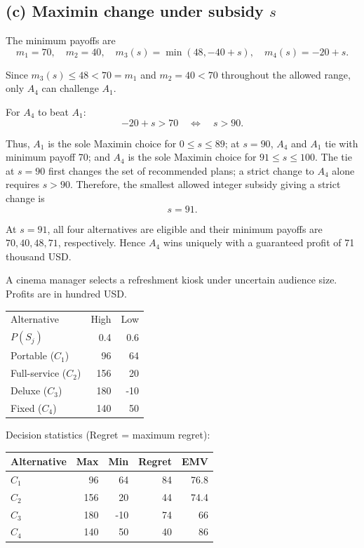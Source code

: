\secInicio[sec:q1]

\label{sol:q1c}
\subsection*{(c) Maximin change under subsidy $s$ }

The minimum payoffs are
\[
m_1=70,\quad m_2=40,\quad
m_3(s)=\min(48,-40+s),\quad m_4(s)=-20+s.
\]

Since $m_3(s)\le48<70=m_1$ and $m_2=40<70$ throughout
the allowed range, only $A_4$ can challenge $A_1$.

For $A_4$ to beat $A_1$:
\[
-20+s>70
\quad\Longleftrightarrow\quad s>90.
\]

Thus, $A_1$ is the sole Maximin choice for $0\le s\le89$;
at $s=90$, $A_4$ and $A_1$ tie with minimum payoff 70;
and $A_4$ is the sole Maximin choice for $91\le s\le100$.
The tie at $s=90$ first changes the set of recommended plans;
a strict change to $A_4$ alone requires $s>90$.
Therefore, the smallest allowed integer subsidy giving a strict change is
\[
\boxed{s=91}.
\]

At $s=91$, all four alternatives are eligible and their minimum
payoffs are $70,40,48,71$, respectively. Hence $A_4$ wins uniquely
with a guaranteed profit of 71 thousand USD.
\secInicio[sec:q1]



A cinema manager selects a refreshment kiosk under uncertain audience size. Profits are in hundred USD.

\begin{center}\small\setlength{\tabcolsep}{4pt}
	\begin{tabular}{lrr}\toprule
		Alternative & High & Low\\
		$P(S_j)$ & 0.4 & 0.6\\ \midrule
		Portable ($C_1$) & 96 & 64\\
		Full-service ($C_2$) & 156 & 20\\
		Deluxe ($C_3$) & 180 & -10\\
		Fixed ($C_4$) & 140 & 50\\
		\bottomrule
	\end{tabular}
\end{center} \vspace{-3mm}

Decision statistics (Regret = maximum regret):

\begin{center}\small\setlength{\tabcolsep}{4pt}
	\begin{tabular}{lrrrr}\toprule
		Alternative & Max & Min & Regret & EMV\\ \midrule
		$C_1$ & 96 & 64 & 84 & 76.8\\
		$C_2$ & 156 & 20 & 44 & 74.4\\
		$C_3$ & 180 & -10 & 74 & 66\\
		$C_4$ & 140 & 50 & 40 & 86\\
		\bottomrule
	\end{tabular}
\end{center}

